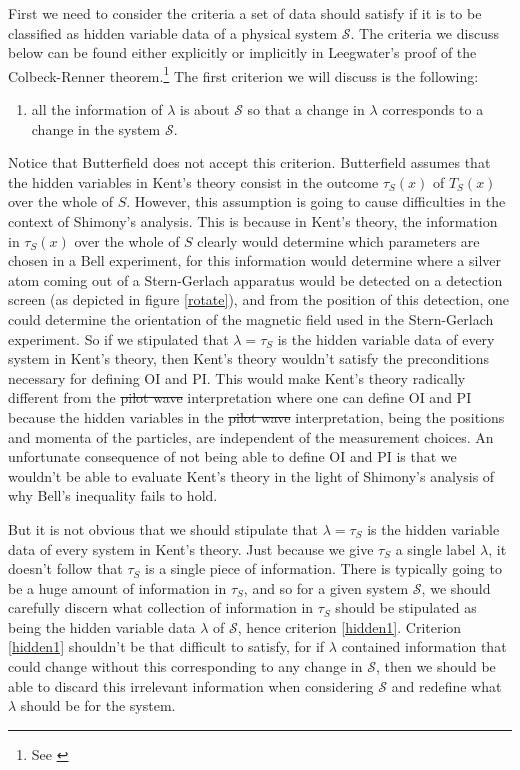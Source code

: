 \documentclass[12pt]{report}
\providecommand{\DIFadd}[1]{{\protect\color{blue}\uwave{#1}}} %
\providecommand{\DIFdel}[1]{{\protect\color{red}\sout{#1}}}                      %
\providecommand{\DIFaddbegin}{} %
\providecommand{\DIFaddend}{} %
\providecommand{\DIFdelbegin}{} %
\providecommand{\DIFdelend}{} %
\begin{document}
First we need to consider the criteria a set of data should satisfy if it is to be classified as hidden variable data of a physical system $\mathcal{S}$. The criteria we discuss below can be found either explicitly or implicitly in Leegwater's proof of the Colbeck-Renner theorem.\footnote{See \cite{LeegwaterGijs2016Aitf}} The first criterion we will discuss is the following:
\begin{enumerate}
	\item all the information of $\lambda$ is about $\mathcal{S}$ so that a change in $\lambda$ corresponds to a change in the system $\mathcal{S}$.\label{hidden1}
\end{enumerate} 
Notice that Butterfield does not accept this criterion. Butterfield assumes that the hidden variables in Kent's theory consist in the outcome $\tau_S(x)$ of $T_S(x)$ over the whole of $S$. However, this assumption is going to cause difficulties in the context of Shimony's analysis. This is because in Kent's theory, the information in $\tau_S(x)$ over the whole of $S$ clearly would determine which parameters are chosen in a Bell experiment, for this information would determine where a silver atom coming out of a Stern-Gerlach apparatus would be detected on a detection screen (as depicted in figure \ref{rotate}), and from the position of this detection, one could determine the orientation of the magnetic field used in the Stern-Gerlach experiment. So if we stipulated that $\lambda=\tau_S$ is the hidden variable data of every system in Kent's theory, then Kent's theory wouldn't satisfy the preconditions necessary for defining OI and PI. This would make Kent's theory radically different from the \DIFdelbegin \DIFdel{pilot wave }\DIFdelend \DIFaddbegin \DIFadd{Bohmian }\DIFaddend interpretation where one can define OI and PI because the hidden variables in the \DIFdelbegin \DIFdel{pilot wave }\DIFdelend \DIFaddbegin \DIFadd{Bohmian }\DIFaddend interpretation, being the positions and momenta of the particles, are independent of the measurement choices. An unfortunate consequence of not being able to define OI and PI is that we wouldn't be able to evaluate Kent's theory in the light of Shimony's analysis of why Bell's inequality fails to hold. 

But it is not obvious that we should stipulate that $\lambda=\tau_S$ is the hidden variable data of every system in Kent's theory. Just because we give $\tau_S$ a single label $\lambda$, it doesn't follow that $\tau_S$ is a single piece of information. There is typically going to be a huge amount of information in $\tau_S$, and so for a given system $\mathcal{S}$, we should carefully discern  what collection of information in $\tau_S$ should be stipulated as being the hidden variable data $\lambda$ of $\mathcal{S}$, hence criterion \ref{hidden1}. Criterion \ref{hidden1} shouldn't be that difficult to satisfy, for if $\lambda$ contained information that could change without this corresponding to any change in $\mathcal{S}$, then we should be able to discard this irrelevant information when considering $\mathcal{S}$ and redefine what $\lambda$ should be for the system. 
\end{document}
